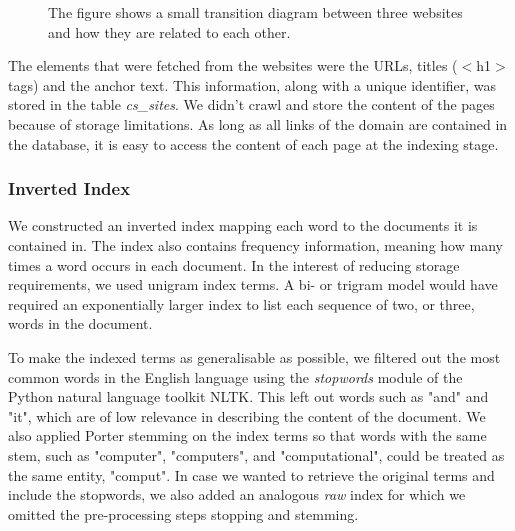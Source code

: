 \begin{figure}[!h]
\centering
{}
\caption{The figure shows a small transition diagram between three websites and how they are related to each other.}
\label{fig:graph}
\end{figure}

The elements that were fetched from the websites were the URLs, titles ($<$h1$>$ tags) and the anchor text. This information, along with a unique identifier, was stored in the table \emph{cs\_sites}. We didn't crawl and store the content of the pages because of storage limitations. As long as all links of the domain are contained in the database, it is easy to access the content of each page at the indexing stage.


\subsubsection{Inverted Index} %
\label{ssub:inverted_index}

We constructed an inverted index mapping each word to the documents it is contained in. The index also contains frequency information, meaning how many times a word occurs in each document. In the interest of reducing storage requirements, we used unigram index terms. A bi- or trigram model would have required an exponentially larger index to list each sequence of two, or three, words in the document.

To make the indexed terms as generalisable as possible, we filtered out the most common words in the English language using the \emph{stopwords} module of the Python natural language toolkit NLTK. This left out words such as "and" and "it", which are of low relevance in describing the content of the document. We also applied Porter stemming \cite{porter1980algorithm} on the index terms so that words with the same stem, such as "computer", "computers", and "computational", could be treated as the same entity, "comput". In case we wanted to retrieve the original terms and include the stopwords, we also added an analogous \emph{raw} index for which we omitted the pre-processing steps stopping and stemming. \\

